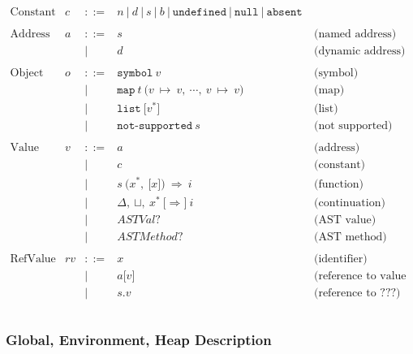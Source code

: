 \documentclass[11pt]{article}
\newcommand{\Term}[1]{\texttt{#1}}
\newcommand{\symctx}[0]{\Delta}
\newcommand{\symctxstack}[0]{\sqcup}
\begin{document}
\[
\begin{array}{rrrll}
\text{Constant} & c & ::= & n\ |\ d\ |\ s\ |\ b\ |\
\Term{undefined}\ |\ \Term{null}\ |\ \Term{absent}\ & \\
\\
\text{Address} & a & ::= & s & \text{(named address)} \\
&&|& d & \text{(dynamic address)}\\
\\
\text{Object} & o & ::= & \Term{symbol}\ v & \text{(symbol)}\\
&&|& \Term{map}\ t\ \Term{(} v\ \mapsto\ v,\ \cdots,\
v\ \mapsto\ v \Term{)} & \text{(map)}\\
&&|& \Term{list}\ \Term{[} v^* \Term{]} & \text{(list)}\\
&&|& \Term{not-supported}\ s & \text{(not supported)}\\
\\
\text{Value} & v & ::= & a & \text{(address)} \\
&&|& c & \text{(constant)}\\
&&|& s\ \Term{(} x^*,\ \Term{[}x\Term{]} \Term{)}\ \Rightarrow\ i
& \text{(function)}\\
&&|& \symctx,\ \symctxstack,\ x^*\ \Term{[} \Rightarrow \Term{]}\ i
& \text{(continuation)}\\
&&|& ASTVal? & \text{(AST value)}\\
&&|& ASTMethod? & \text{(AST method)}\\
\\

\text{RefValue} & rv & ::= & x & \text{(identifier)}\\
&&|& a\Term{[} v \Term{]} & \text{(reference to value of map in heap)}\\
&&|& s\Term{.}v & \text{(reference to ???)}\\
\\


\end{array}
\]

\subsubsection{Global, Environment, Heap Description}
\end{document}
